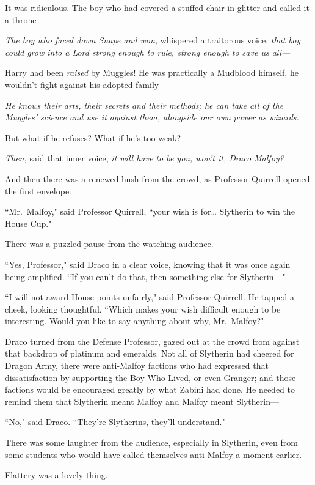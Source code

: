 It was ridiculous. The boy who had covered a stuffed chair in glitter and called it a throne—

\emph{The boy who faced down Snape and won,} whispered a traitorous voice, \emph{that boy could grow into a Lord strong enough to rule, strong enough to save us all—}

Harry had been \emph{raised} by Muggles! He was practically a Mudblood himself, he wouldn't fight against his adopted family—

\emph{He knows their arts, their secrets and their methods; he can take all of the Muggles' science and use it against them, alongside our own power as wizards.}

But what if he refuses? What if he's too weak?

\emph{Then,} said that inner voice, \emph{it will have to be you, won't it, Draco Malfoy?}

And then there was a renewed hush from the crowd, as Professor Quirrell opened the first envelope.

``Mr.~Malfoy," said Professor Quirrell, ``your wish is for{\ldots} Slytherin to win the House Cup."

There was a puzzled pause from the watching audience.

``Yes, Professor," said Draco in a clear voice, knowing that it was once again being amplified. ``If you can't do that, then something else for Slytherin—"

``I will not award House points unfairly," said Professor Quirrell. He tapped a cheek, looking thoughtful. ``Which makes your wish difficult enough to be interesting. Would you like to say anything about why, Mr.~Malfoy?"

Draco turned from the Defense Professor, gazed out at the crowd from against that backdrop of platinum and emeralds. Not all of Slytherin had cheered for Dragon Army, there were anti-Malfoy factions who had expressed that dissatisfaction by supporting the Boy-Who-Lived, or even Granger; and those factions would be encouraged greatly by what Zabini had done. He needed to remind them that Slytherin meant Malfoy and Malfoy meant Slytherin—

``No," said Draco. ``They're Slytherins, they'll understand."

There was some laughter from the audience, especially in Slytherin, even from some students who would have called themselves anti-Malfoy a moment earlier.

Flattery was a lovely thing.


